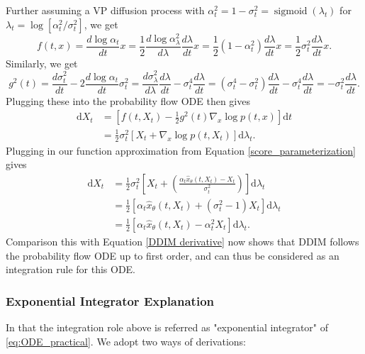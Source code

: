 \documentclass{article}
\theoremstyle{plain}
\theoremstyle{definition}
\theoremstyle{remark}
\begin{document}
Further assuming a VP diffusion process with $\alpha_t^2=1-\sigma_t^2=\operatorname{sigmoid}\left(\lambda_t\right)$ for $\lambda_t=\log \left[\alpha_t^2 / \sigma_t^2\right]$, we get
$$
f(t,x)=\frac{d \log \alpha_t}{d t} x=\frac{1}{2} \frac{d \log \alpha_\lambda^2}{d \lambda} \frac{d \lambda}{d t} x=\frac{1}{2}\left(1-\alpha_t^2\right) \frac{d \lambda}{d t} x=\frac{1}{2} \sigma_t^2 \frac{d \lambda}{d t} x.
$$
Similarly, we get
$$
g^2(t)=\frac{d \sigma_t^2}{d t}-2 \frac{d \log \alpha_t}{d t} \sigma_t^2=\frac{d \sigma_\lambda^2}{d \lambda} \frac{d \lambda}{d t}-\sigma_t^4 \frac{d \lambda}{d t}=\left(\sigma_t^4-\sigma_t^2\right) \frac{d \lambda}{d t}-\sigma_t^4 \frac{d \lambda}{d t}=-\sigma_t^2 \frac{d \lambda}{d t}.
$$
Plugging these into the probability flow ODE then gives
\begin{equation}
\label{eq:DDIM ODE}
\begin{aligned}
\mathrm{d} X_t & =\left[f(t,X_t)-\frac{1}{2} g^2(t) \nabla_x \log p(t,x)\right] \mathrm{d} t \\
& =\frac{1}{2} \sigma_t^2\left[X_t+\nabla_x \log p(t,X_t)\right] \mathrm{d} \lambda_t .
\end{aligned}
\end{equation}
Plugging in our function approximation from Equation  \eqref{score_parameterization} gives
\begin{equation}
\label{eq:ODE_practical}
\begin{aligned}
\mathrm{d}  X_t & =\frac{1}{2} \sigma_t^2\left[X_t+\left(\frac{\alpha_t \hat{x}_\theta\left(t,X_t\right)-X_t}{\sigma_t^2}\right)\right] \mathrm{d} \lambda_t \\
& =\frac{1}{2}\left[\alpha_t \hat{x}_\theta\left(t,X_t\right)+\left(\sigma_t^2-1\right) X_t\right] \mathrm{d} \lambda_t \\
& =\frac{1}{2}\left[\alpha_t\hat{x}_\theta\left(t,X_t\right)-\alpha_t^2 X_t\right]\mathrm{d} \lambda_t .
\end{aligned}
\end{equation}
Comparison this with Equation \eqref{DDIM derivative} now shows that DDIM follows the probability flow ODE up to first order, and can thus be considered as an integration rule for this ODE. 

\subsubsection{Exponential Integrator Explanation}
In \cite{zhang2022fast} that the integration role above is referred as "exponential integrator" of \eqref{eq:ODE_practical}. We adopt two ways of derivations:
\end{document}
